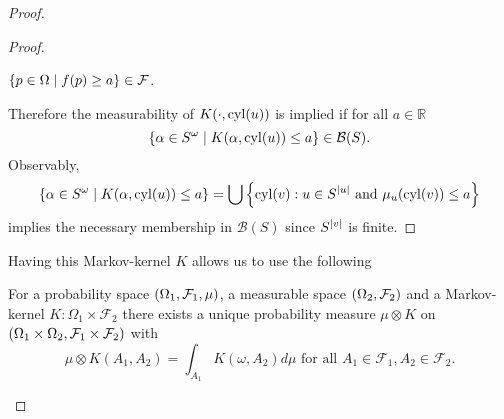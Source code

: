\begin{proof}
\begin{proof}
\begin{theorem}
\begin{enumerate}
          $\left\{p\in\Omega\mid f(p) \geq a\right\}\in\mathcal{F}$.
      \end{enumerate}
    \end{theorem}
    Therefore the measurability of $K(\cdot, \operatorname{cyl}(u))$ is implied if for all 
    $a\in\mathbb{R}$
    \begin{equation*}
      \left\{\alpha\in S^{\omega}\mid K(\alpha, \operatorname{cyl}(u))\leq a\right\}\in\mathcal{B}(S).
    \end{equation*}
    Observably,
    \begin{equation*}
      \left\{\alpha\in S^{\omega}\mid K(\alpha, \operatorname{cyl}(u))\leq a\right\} = 
        \bigcup\left\{
          \operatorname{cyl}(v):u\in S^{\left\vert{u}\right\vert}\text{ and }\mu_{u}(\operatorname{cyl}(v))\leq a
        \right\}
    \end{equation*}
    implies the necessary membership in $\mathcal{B}(S)$ since $S^{\left\vert{v}\right\vert}$ 
    is finite.
  \end{proof}
  Having this Markov-kernel $K$ allows us to use the following
  \begin{theorem}
    \cite[Korollar 14.23]{Klenke}
    For a probability space $\left(\Omega_{1}, \mathcal{F}_{1}, \mu\right)$, a
    measurable space $\left(\Omega_{2}, \mathcal{F}_{2}\right)$ and a Markov-kernel
    $K:\Omega_{1}\times\mathcal{F}_{2}$ there exists a unique probability 
    measure $\mu\otimes K$ on $\left(\Omega_{1}\times \Omega_{2}, 
    \mathcal{F}_{1}\times\mathcal{F}_{2}\right)$ with
    \begin{equation*}
      \mu\otimes K(A_{1}, A_{2}) = \int_{A_{1}} K(\omega, A_{2})d\mu
      \text{ for all }A_{1}\in\mathcal{F}_{1}, A_{2}\in\mathcal{F}_{2}.
    \end{equation*}
  \end{theorem}
  

\end{proof}
